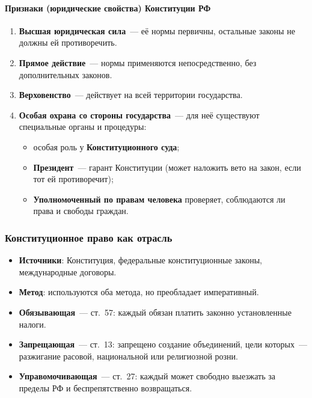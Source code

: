 \documentclass[12pt]{article}
\begin{document}
	\paragraph{Признаки (юридические свойства) Конституции РФ}
	
	\begin{enumerate}
		\item \textbf{Высшая юридическая сила}~--- её нормы первичны, остальные законы не должны ей противоречить.
		\item \textbf{Прямое действие}~--- нормы применяются непосредственно, без дополнительных законов.
		\item \textbf{Верховенство}~--- действует на всей территории государства.
		\item \textbf{Особая охрана со стороны государства}~--- для неё существуют специальные органы и процедуры:
		\begin{itemize}
			\item особая роль у \textbf{Конституционного суда};
			\item \textbf{Президент}~--- гарант Конституции (может наложить вето на закон, если тот ей противоречит);
			\item \textbf{Уполномоченный по правам человека} проверяет, соблюдаются ли права и свободы граждан.
		\end{itemize}
	\end{enumerate}
	
	\subsubsection{Конституционное право как отрасль}
	
	\begin{itemize}
		\item \textbf{Источники}: Конституция, федеральные конституционные законы, международные договоры.
		\item \textbf{Метод}: используются оба метода, но преобладает императивный.
	\end{itemize}
	
	\begin{example}
		\begin{itemize}
			\item \textbf{Обязывающая}~--- ст.~57: каждый обязан платить законно установленные налоги.
			\item \textbf{Запрещающая}~--- ст.~13: запрещено создание объединений, цели которых~--- разжигание расовой, национальной или религиозной розни.
			\item \textbf{Управомочивающая}~--- ст.~27: каждый может свободно выезжать за пределы РФ и беспрепятственно возвращаться.
		\end{itemize}
	\end{example}
	
\end{document}
